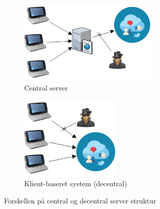 \begin{figure}[H]
    \begin{subfigure}{0.5\textwidth}
        \centering
        \includegraphics[width=1\linewidth, height=4cm]{Projectdoc/Assets/Illustrationer/Security_diagram_1.png} 
        \caption{Central server}
        \label{fig:central_server}
    \end{subfigure}
    \begin{subfigure}{0.5\textwidth}
        \centering
        \includegraphics[width=0.7\linewidth, height=4cm]{Projectdoc/Assets/Illustrationer/Security_diagram_2.png}
        \caption{Klient-baseret system (decentral)}
        \label{fig:decentral_server}
    \end{subfigure}
    \caption{Forskellen på central og decentral server struktur}
    \label{fig:serverstruktur}
\end{figure}

